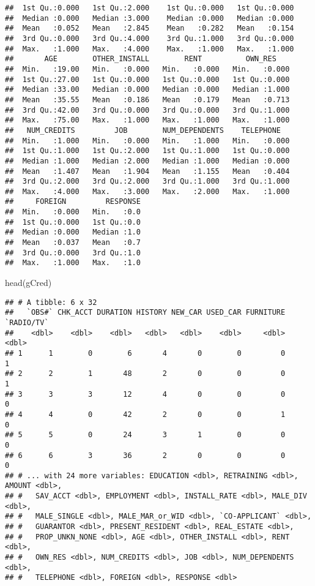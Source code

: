 \documentclass[
]{article}
\newenvironment{Shaded}{\begin{snugshade}}{\end{snugshade}}
\newcommand{\FunctionTok}[1]{\textcolor[rgb]{0.00,0.00,0.00}{#1}}
\newcommand{\NormalTok}[1]{#1}
\begin{document}
\begin{verbatim}
##  1st Qu.:0.000   1st Qu.:2.000    1st Qu.:0.000   1st Qu.:0.000  
##  Median :0.000   Median :3.000    Median :0.000   Median :0.000  
##  Mean   :0.052   Mean   :2.845    Mean   :0.282   Mean   :0.154  
##  3rd Qu.:0.000   3rd Qu.:4.000    3rd Qu.:1.000   3rd Qu.:0.000  
##  Max.   :1.000   Max.   :4.000    Max.   :1.000   Max.   :1.000  
##       AGE        OTHER_INSTALL        RENT          OWN_RES     
##  Min.   :19.00   Min.   :0.000   Min.   :0.000   Min.   :0.000  
##  1st Qu.:27.00   1st Qu.:0.000   1st Qu.:0.000   1st Qu.:0.000  
##  Median :33.00   Median :0.000   Median :0.000   Median :1.000  
##  Mean   :35.55   Mean   :0.186   Mean   :0.179   Mean   :0.713  
##  3rd Qu.:42.00   3rd Qu.:0.000   3rd Qu.:0.000   3rd Qu.:1.000  
##  Max.   :75.00   Max.   :1.000   Max.   :1.000   Max.   :1.000  
##   NUM_CREDITS         JOB        NUM_DEPENDENTS    TELEPHONE    
##  Min.   :1.000   Min.   :0.000   Min.   :1.000   Min.   :0.000  
##  1st Qu.:1.000   1st Qu.:2.000   1st Qu.:1.000   1st Qu.:0.000  
##  Median :1.000   Median :2.000   Median :1.000   Median :0.000  
##  Mean   :1.407   Mean   :1.904   Mean   :1.155   Mean   :0.404  
##  3rd Qu.:2.000   3rd Qu.:2.000   3rd Qu.:1.000   3rd Qu.:1.000  
##  Max.   :4.000   Max.   :3.000   Max.   :2.000   Max.   :1.000  
##     FOREIGN         RESPONSE  
##  Min.   :0.000   Min.   :0.0  
##  1st Qu.:0.000   1st Qu.:0.0  
##  Median :0.000   Median :1.0  
##  Mean   :0.037   Mean   :0.7  
##  3rd Qu.:0.000   3rd Qu.:1.0  
##  Max.   :1.000   Max.   :1.0
\end{verbatim}

\begin{Shaded}
\begin{Highlighting}[]
\FunctionTok{head}\NormalTok{(gCred)}
\end{Highlighting}
\end{Shaded}

\begin{verbatim}
## # A tibble: 6 x 32
##   `OBS#` CHK_ACCT DURATION HISTORY NEW_CAR USED_CAR FURNITURE `RADIO/TV`
##    <dbl>    <dbl>    <dbl>   <dbl>   <dbl>    <dbl>     <dbl>      <dbl>
## 1      1        0        6       4       0        0         0          1
## 2      2        1       48       2       0        0         0          1
## 3      3        3       12       4       0        0         0          0
## 4      4        0       42       2       0        0         1          0
## 5      5        0       24       3       1        0         0          0
## 6      6        3       36       2       0        0         0          0
## # ... with 24 more variables: EDUCATION <dbl>, RETRAINING <dbl>, AMOUNT <dbl>,
## #   SAV_ACCT <dbl>, EMPLOYMENT <dbl>, INSTALL_RATE <dbl>, MALE_DIV <dbl>,
## #   MALE_SINGLE <dbl>, MALE_MAR_or_WID <dbl>, `CO-APPLICANT` <dbl>,
## #   GUARANTOR <dbl>, PRESENT_RESIDENT <dbl>, REAL_ESTATE <dbl>,
## #   PROP_UNKN_NONE <dbl>, AGE <dbl>, OTHER_INSTALL <dbl>, RENT <dbl>,
## #   OWN_RES <dbl>, NUM_CREDITS <dbl>, JOB <dbl>, NUM_DEPENDENTS <dbl>,
## #   TELEPHONE <dbl>, FOREIGN <dbl>, RESPONSE <dbl>
\end{verbatim}
\end{document}
